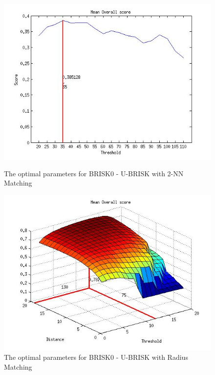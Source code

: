 \begin{figure}
\begin{minipage}[b]{0.5\linewidth}
\includegraphics[scale=0.4]{../Drawings/OptimalParameters_SBRISK_UBRISK_KNN.jpg}
\caption{The optimal parameters for BRISK0 - U-BRISK with 2-NN Matching}
\label{fig:BRISK0UBRISKknnOptimal}
\end{minipage}
\begin{minipage}[b]{0.5\linewidth}
\includegraphics[scale=0.4]{../Drawings/OptimalParameters_SBRISK_UBRISK_Hamming.jpg}
\caption{The optimal parameters for BRISK0 - U-BRISK with Radius Matching}
\label{fig:BRISK0UBRISKHammingOptimal}
\end{minipage}
\end{figure}

